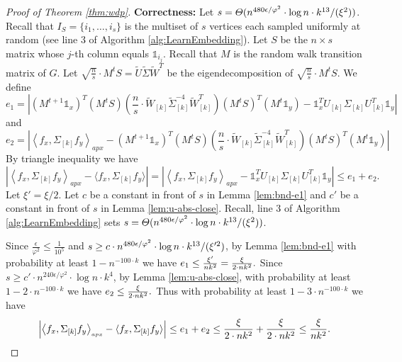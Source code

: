 \documentclass[letterpaper,11pt]{article}
\theoremstyle{plain}
\theoremstyle{definition}
\theoremstyle{remark}
\newcommand{\adp}[1]
  {\ensuremath{\left\langle #1 \right\rangle_{\scriptscriptstyle apx}}}
\newcommand{\mycolor}[1]{\textcolor{black}{#1}}
\begin{document}
\begin{proof}[Proof of Theorem \ref{thm:wdp}]
\textbf{Correctness:}
Let $s= \varTheta{(n^{480\epsilon / \varphi^2}\cdot \log n \cdot \mycolor{k^{13}}/(\xi^2))}$. Recall that $I_S=\{i_1,\ldots, i_s\}$ is the multiset of $s$ vertices each sampled uniformly at random (see line 3 of Algorithm \ref{alg:LearnEmbedding}).  Let $S$ be the $n\times s$ matrix whose $j$-th column equals $\mathds{1}_{i_j}$. Recall that $M$ is the random walk transition matrix of $G$. Let $\sqrt{\frac{n}{s}} \cdot M^tS=\widetilde{U}\widetilde{\Sigma}\widetilde{W}^T$  be  the eigendecomposition of $\sqrt{\frac{n}{s}} \cdot M^tS$. We define
\[e_1=\left|(M^{t+1}\mathds{1}_{x})^T  (M^tS)\left(\frac{n}{s}\cdot\widetilde{W}_{[k]} \widetilde{\Sigma}^{-4}_{[k]} \widetilde{W}^T_{[k]}\right) (M^tS)^T (M^{t}\mathds{1}_{y}) -  \mathds{1}_x^T U_{[k]}\Sigma_{[k]}{U}_{[k]}^T  \mathds{1}_y \right| \]
and 
\[e_2=\left| \adp{f_{x},\Sigma_{[k]} f_y} - (M^{t+1}\mathds{1}_{x})^T  (M^tS)\left(\frac{n}{s}\cdot\widetilde{W}_{[k]} \widetilde{\Sigma}^{-4}_{[k]} \widetilde{W}^T_{[k]}\right) (M^tS)^T (M^{t}\mathds{1}_{y}) \right| \]
By triangle inequality we have 
\[\left|\adp{f_{x},\Sigma_{[k]}f_y}  - \langle f_x, \Sigma_{[k]}f_y \rangle \right|  = \left|\adp{f_{x},\Sigma_{[k]}f_y} - \mathds{1}_x^T U_{[k]}\Sigma_{[k]}{U}_{[k]}^T  \mathds{1}_y \right| \leq e_1 + e_2 \text{.}\]
Let $\xi'=\xi/2$.  Let $c$ be a constant in front of $s$ in Lemma \ref{lem:bnd-e1} and  $c'$ be a 
constant in front of $s$ in Lemma \ref{lem:u-abs-close}. Recall, line 3 of Algorithm 
\ref{alg:LearnEmbedding} sets $s= \varTheta{(n^{480\epsilon / \varphi^2}\cdot \log n \cdot \mycolor{k^{13}}/(\xi^2))}$. 

Since $\frac{\epsilon}{\varphi^2}\leq \frac{1}{10^5}$ and $s\geq c\cdot n^{480\epsilon / \varphi^2}\cdot \log n \cdot \mycolor{k^{13}}/(\xi'^2)$, by Lemma \ref{lem:bnd-e1} with probability at least $1-n^{-100\cdot k}$ we have $e_1\leq \frac{\xi'}{\mycolor{nk^2}}=\frac{\xi}{\mycolor{2\cdot nk^2}} \text{.}$ 
Since  
$s \geq c'\cdot n^{240\epsilon / \varphi^2}\cdot \log n \cdot k^{4}$, by 
Lemma \ref{lem:u-abs-close}, with probability at least $1-2\cdot n^{-100\cdot k}$ we have 
$e_2 \leq \frac{\xi}{\mycolor{2\cdot nk^2}}\text{.}$ Thus with probability at least $1-3\cdot n^{-100\cdot k}$ we 
have 
\[\left| \adp{f_{x},\Sigma_{[k]}f_y}  - \langle f_x, \Sigma_{[k]}f_y \rangle \right|  \leq e_1 + e_2 \leq \frac{\xi}{\mycolor{2\cdot n k^2}}+\frac{\xi}{\mycolor{2\cdot nk^2}} \leq \frac{\xi}{\mycolor{nk^2}}\text{.}\]


\end{proof}
\end{document}
